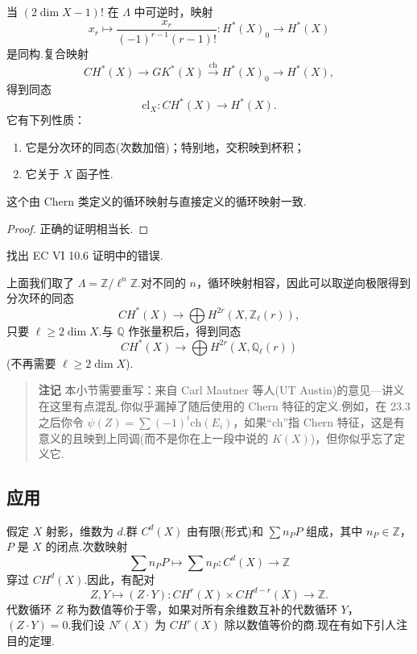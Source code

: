 当 $(2\dim X - 1)!$ 在 $\Lambda$ 中可逆时，映射
\[
x_r \mapsto \frac{x_r}{(-1)^{r-1}(r-1)!} \colon H^{*}(X)_0 \to H^{*}(X)
\]
是同构.复合映射
\[
CH^{*}(X) \to GK^{*}(X) \xrightarrow{\mathrm{ch}} H^{*}(X)_0 \to H^{*}(X),
\]
得到同态
\[
\mathrm{cl}_X \colon CH^{*}(X) \to H^{*}(X).
\]
它有下列性质：
\begin{enumerate}
  \item 它是分次环的同态(次数加倍)；特别地，交积映到杯积；
  \item 它关于 $X$ 函子性.
\end{enumerate}

\begin{theorem}\label{thm:23.4}
这个由 Chern 类定义的循环映射与直接定义的循环映射一致.
\end{theorem}

\begin{proof}
正确的证明相当长.
\end{proof}

\begin{exercise}\label{exc:23.5}
找出 EC VI 10.6 证明中的错误.
\end{exercise}

上面我们取了 $\Lambda = \mathbb{Z}/\ell^{n}\mathbb{Z}$.对不同的 $n$，循环映射相容，因此可以取逆向极限得到分次环的同态
\[
CH^{*}(X) \to \bigoplus H^{2r}(X, \mathbb{Z}_{\ell}(r)),
\]
只要 $\ell \geq 2\dim X$.与 $\mathbb{Q}$ 作张量积后，得到同态
\[
CH^{*}(X) \to \bigoplus H^{2r}(X, \mathbb{Q}_{\ell}(r))
\]
(不再需要 $\ell \geq 2\dim X$).

\begin{quote}
\textbf{注记} 本小节需要重写：来自 Carl Mautner 等人(UT Austin)的意见---讲义在这里有点混乱.你似乎漏掉了随后使用的 Chern 特征的定义.例如，在 23.3 之后你令 $\psi(Z) = \sum (-1)^{i}\mathrm{ch}(E_i)$，如果``ch''指 Chern 特征，这是有意义的且映到上同调(而不是你在上一段中说的 $K(X)$)，但你似乎忘了定义它.
\end{quote}

\subsection*{应用}

假定 $X$ 射影，维数为 $d$.群 $C^{d}(X)$ 由有限(形式)和 $\sum n_P P$ 组成，其中 $n_P \in \mathbb{Z}$，$P$ 是 $X$ 的闭点.次数映射
\[
\sum n_P P \mapsto \sum n_P \colon C^{d}(X) \to \mathbb{Z}
\]
穿过 $CH^{d}(X)$.因此，有配对
\[
Z, Y \mapsto (Z \cdot Y) \colon CH^{r}(X) \times CH^{d-r}(X) \to \mathbb{Z}.
\]
代数循环 $Z$ 称为数值等价于零，如果对所有余维数互补的代数循环 $Y$，$(Z \cdot Y) = 0$.我们设 $N^{r}(X)$ 为 $CH^{r}(X)$ 除以数值等价的商.现在有如下引人注目的定理.

